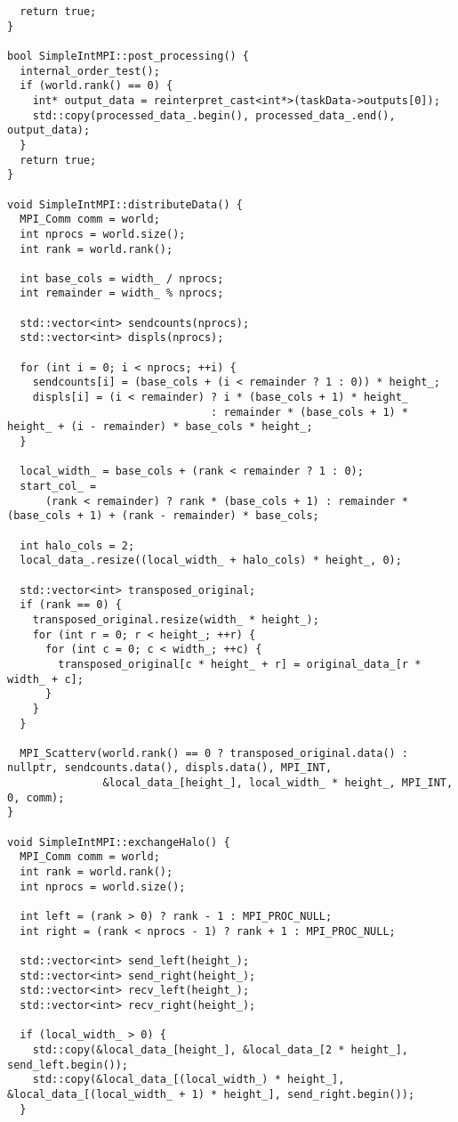\documentclass[12pt]{article}
\begin{document}
\begin{lstlisting}
  return true;
}

bool SimpleIntMPI::post_processing() {
  internal_order_test();
  if (world.rank() == 0) {
    int* output_data = reinterpret_cast<int*>(taskData->outputs[0]);
    std::copy(processed_data_.begin(), processed_data_.end(), output_data);
  }
  return true;
}

void SimpleIntMPI::distributeData() {
  MPI_Comm comm = world;
  int nprocs = world.size();
  int rank = world.rank();

  int base_cols = width_ / nprocs;
  int remainder = width_ % nprocs;

  std::vector<int> sendcounts(nprocs);
  std::vector<int> displs(nprocs);

  for (int i = 0; i < nprocs; ++i) {
    sendcounts[i] = (base_cols + (i < remainder ? 1 : 0)) * height_;
    displs[i] = (i < remainder) ? i * (base_cols + 1) * height_
                                : remainder * (base_cols + 1) * height_ + (i - remainder) * base_cols * height_;
  }

  local_width_ = base_cols + (rank < remainder ? 1 : 0);
  start_col_ =
      (rank < remainder) ? rank * (base_cols + 1) : remainder * (base_cols + 1) + (rank - remainder) * base_cols;

  int halo_cols = 2;
  local_data_.resize((local_width_ + halo_cols) * height_, 0);

  std::vector<int> transposed_original;
  if (rank == 0) {
    transposed_original.resize(width_ * height_);
    for (int r = 0; r < height_; ++r) {
      for (int c = 0; c < width_; ++c) {
        transposed_original[c * height_ + r] = original_data_[r * width_ + c];
      }
    }
  }

  MPI_Scatterv(world.rank() == 0 ? transposed_original.data() : nullptr, sendcounts.data(), displs.data(), MPI_INT,
               &local_data_[height_], local_width_ * height_, MPI_INT, 0, comm);
}

void SimpleIntMPI::exchangeHalo() {
  MPI_Comm comm = world;
  int rank = world.rank();
  int nprocs = world.size();

  int left = (rank > 0) ? rank - 1 : MPI_PROC_NULL;
  int right = (rank < nprocs - 1) ? rank + 1 : MPI_PROC_NULL;

  std::vector<int> send_left(height_);
  std::vector<int> send_right(height_);
  std::vector<int> recv_left(height_);
  std::vector<int> recv_right(height_);

  if (local_width_ > 0) {
    std::copy(&local_data_[height_], &local_data_[2 * height_], send_left.begin());
    std::copy(&local_data_[(local_width_) * height_], &local_data_[(local_width_ + 1) * height_], send_right.begin());
  }


\end{lstlisting}
\end{document}
